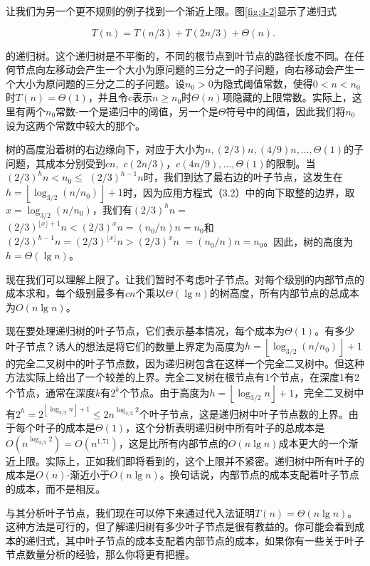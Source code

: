 \documentclass[lang=cn,newtx,10pt,scheme=chinese]{elegantbook}
\begin{document}
让我们为另一个更不规则的例子找到一个渐近上限。图\ref{fig:4-2}显示了递归式

\begin{equation}
T(n)=T(n / 3)+T(2 n / 3)+\Theta(n) \text {. }
\end{equation}

的递归树。这个递归树是不平衡的，不同的根节点到叶节点的路径长度不同。在任何节点向左移动会产生一个大小为原问题的三分之一的子问题，向右移动会产生一个大小为原问题的三分之二的子问题。设$n_0>0$为隐式阈值常数，使得$0<n<n_0$时$T(n)=\Theta(1)$，并且令$c$表示$n \geq n_0$时$\Theta(n)$项隐藏的上限常数。实际上，这里有两个$n_0$常数-一个是递归中的阈值，另一个是$\Theta$符号中的阈值，因此我们将$n_0$设为这两个常数中较大的那个。

树的高度沿着树的右边缘向下，对应于大小为$n,(2 / 3) n,(4 / 9) n, \ldots, \Theta(1)$的子问题，其成本分别受到$cn,$ $c(2 n / 3)$，$c(4 n / 9), \ldots, \Theta(1)$的限制。当$(2 / 3)^h n<n_0 \leq$ $(2 / 3)^{h-1} n$时，我们到达了最右边的叶子节点，这发生在$h=\left\lfloor\log _{3 / 2}\left(n / n_0\right)\right\rfloor+1$时，因为应用方程式（3.2）中的向下取整的边界，取$x=\log _{3 / 2}\left(n / n_0\right)$，我们有$(2 / 3)^h n=$ $(2 / 3)^{\lfloor x\rfloor+1} n<(2 / 3)^x n=\left(n_0 / n\right) n=n_0$和$(2 / 3)^{h-1} n=(2 / 3)^{\lfloor x\rfloor} n>(2 / 3)^x n$ $=\left(n_0 / n\right) n=n_0$。因此，树的高度为$h=\Theta(\lg n)$。

现在我们可以理解上限了。让我们暂时不考虑叶子节点。对每个级别的内部节点的成本求和，每个级别最多有$c n$个乘以$\Theta(\lg n)$的树高度，所有内部节点的总成本为$O(n \lg n)$。

现在要处理递归树的叶子节点，它们表示基本情况，每个成本为$\Theta(1)$。有多少叶子节点？诱人的想法是将它们的数量上界定为高度为$h=\left\lfloor\log _{3 / 2}\left(n / n_0\right)\right\rfloor+1$的完全二叉树中的叶子节点数，因为递归树包含在这样一个完全二叉树中。但这种方法实际上给出了一个较差的上界。完全二叉树在根节点有1个节点，在深度1有2个节点，通常在深度$k$有$2^k$个节点。由于高度为$h=\left\lfloor\log _{3 / 2} n\right\rfloor+1$，完全二叉树中有$2^h=2^{\left\lfloor\log _{3 / 2} n\right\rfloor+1} \leq 2 n^{\log _{3 / 2} 2}$个叶子节点，这是递归树中叶子节点数的上界。由于每个叶子的成本是$\Theta(1)$，这个分析表明递归树中所有叶子的总成本是$O\left(n^{\log _{3 / 2} 2}\right)=O\left(n^{1.71}\right)$，这是比所有内部节点的$O(n \lg n)$成本更大的一个渐近上限。实际上，正如我们即将看到的，这个上限并不紧密。递归树中所有叶子的成本是$O(n)$-渐近小于$O(n \lg n)$。换句话说，内部节点的成本支配着叶子节点的成本，而不是相反。

与其分析叶子节点，我们现在可以停下来通过代入法证明$T(n)=\Theta(n \lg n)$。这种方法是可行的，但了解递归树有多少叶子节点是很有教益的。你可能会看到成本的递归式，其中叶子节点的成本支配着内部节点的成本，如果你有一些关于叶子节点数量分析的经验，那么你将更有把握。
\end{document}
